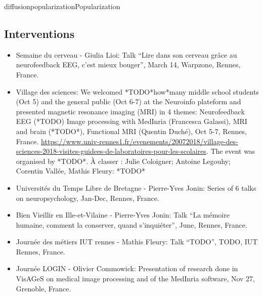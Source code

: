 \documentclass{ra2018}
\begin{document}
\begin{module}{diffusion}{popularization}{Popularization}
\subsection{Interventions}
\begin{itemize}
    \item Semaine du cerveau - Giulia Lioi: Talk ``Lire dans son cerveau grâce au neurofeedback EEG, c’est mieux bouger'', March 14, Warpzone, Rennes, France. 
    \item Village des sciences: We welcomed *TODO*how*many middle school students (Oct 5) and the general public (Oct 6-7) at the Neuroinfo plateform and presented magnetic resonance imaging (MRI) in 4 themes: Neurofeedback EEG (*TODO)
    Image processing with MedInria (Francesca Galassi), MRI and brain (*TODO*), Functional MRI (Quentin Duché), Oct 5-7, Rennes, France. \url{https://www.univ-rennes1.fr/evenements/20072018/village-des-sciences-2018-visites-guidees-de-laboratoires-pour-les-scolaires}. The event was organised by *TODO*.
    \newline
    À classer : Julie Coloigner; Antoine Legouhy; Corentin Vallée, Mathis Fleury: *TODO*
    \item Universités du Temps Libre de Bretagne - Pierre-Yves Jonin: Series of 6 talks on neuropsychology, Jan-Dec, Rennes, France. 
    \item Bien Vieillir en Ille-et-Vilaine - Pierre-Yves Jonin: Talk ``La mémoire humaine, comment la conserver, quand s’inquiéter'', June, Rennes, France. 
    \item Journée des métiers IUT rennes - Mathis Fleury: Talk ``TODO'', TODO, IUT Rennes, France. %
    \item Journée LOGIN - Olivier Commowick: Presentation of research done in VisAGeS on medical image processing and of the MedInria software, Nov 27, Grenoble, France. 
\end{itemize}
      


\end{module}
\end{document}
